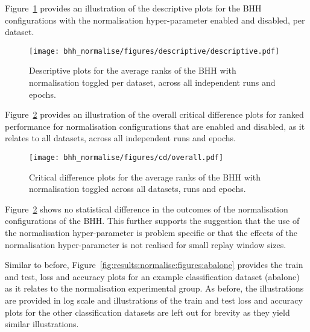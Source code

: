 Figure~\ref{fig:results:normalise:descriptive:descriptive} provides an illustration of the descriptive plots for the \acs{BHH} configurations with the normalisation hyper-parameter enabled and disabled, per dataset.

\begin{figure}[htb]
      \centering
      \texttt{[image: bhh\_normalise/figures/descriptive/descriptive.pdf]}
      \caption{Descriptive plots for the average ranks of the \acs{BHH} with normalisation toggled per dataset, across all independent runs and epochs.}
      \label{fig:results:normalise:descriptive:descriptive}
\end{figure}

Figure~\ref{fig:results:normalise:descriptive:cd} provides an illustration of the overall critical difference plots for ranked performance for normalisation configurations that are enabled and disabled, as it relates to all datasets, across all independent runs and epochs.

\begin{figure}[htb]
      \centering
      \texttt{[image: bhh\_normalise/figures/cd/overall.pdf]}
      \caption{Critical difference plots for the average ranks of the \acs{BHH} with normalisation toggled across all datasets, runs and epochs.}
      \label{fig:results:normalise:descriptive:cd}
\end{figure}

Figure~\ref{fig:results:normalise:descriptive:cd} shows no statistical difference in the outcomes of the normalisation configurations of the \acs{BHH}. This further supports the suggestion that the use of the normalisation hyper-parameter is problem specific or that the effects of the normalisation hyper-parameter is not realised for small replay window sizes.

Similar to before, Figure~\ref{fig:results:normalise:figures:abalone} provides the train and test, loss and accuracy plots for an example classification dataset (abalone) as it relates to the normalisation experimental group. As before, the illustrations are provided in log scale and illustrations of the train and test loss and accuracy plots for the other classification datasets are left out for brevity as they yield similar illustrations.

